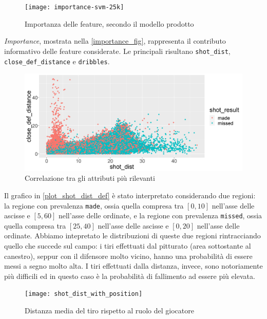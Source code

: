 \begin{figure}[H]
\centering
\caption{Importanza delle feature, secondo il modello prodotto}
\label{importance_fig}
	\texttt{[image: importance-svm-25k]}
\end{figure}

\par

\textit{Importance}, mostrata nella \autoref{importance_fig}, rappresenta il contributo informativo delle feature considerate. Le principali risultano \texttt{shot\_dist}, \texttt{close\_def\_distance} e \texttt{dribbles}.

\begin{figure}[H]
\caption{Correlazione tra gli attributi più rilevanti}
\label{plot_shot_dist_def}
\includegraphics[width=\linewidth]{plot_shot_dist_def.png}
\end{figure}

Il grafico in \autoref{plot_shot_dist_def} è stato interpretato considerando due regioni: la regione con prevalenza \texttt{made}, ossia quella compresa tra $[0, 10]$ nell'asse delle ascisse e $[5, 60] $ nell'asse delle ordinate, e la regione con prevalenza \texttt{missed}, ossia quella compresa tra $[25, 40]$ nell'asse delle ascisse e $[0, 20] $ nell'asse delle ordinate.
Abbiamo intepretato le distribuzioni di queste due regioni rintracciando quello che succede sul campo: i tiri effettuati dal pitturato (area sottostante al canestro), seppur con il difensore molto vicino, hanno una probabilità di essere messi a segno molto alta. I tiri effettuati dalla distanza, invece, sono notoriamente più difficili ed in questo caso è la probabilità di fallimento ad essere più elevata.

\par

\begin{figure}
\caption{Distanza media del tiro rispetto al ruolo del giocatore}
\label{position_shot_dist}
\texttt{[image: shot\_dist\_with\_position]}
\end{figure}

